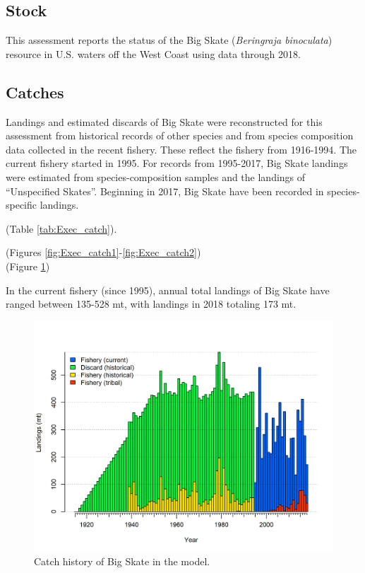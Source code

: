 \documentclass[12pt,]{article}
\begin{document}
\hypertarget{stock}{%
\subsection*{Stock}\label{stock}}

This assessment reports the status of the Big Skate
(\emph{Beringraja binoculata}) resource in U.S. waters off the West
Coast using data through 2018.

\hypertarget{catches}{%
\subsection*{Catches}\label{catches}}

Landings and estimated discards of Big Skate were reconstructed for this
assessment from historical records of other species and from species
composition data collected in the recent fishery. These reflect the
fishery from 1916-1994. The current fishery started in 1995. For records
from 1995-2017, Big Skate landings were estimated from
species-composition samples and the landings of ``Unspecified Skates''.
Beginning in 2017, Big Skate have been recorded in species-specific
landings.

(Table \ref{tab:Exec_catch}).

(Figures \ref{fig:Exec_catch1}-\ref{fig:Exec_catch2})\\
(Figure \ref{fig:r4ss_catches})

In the current fishery (since 1995), annual total landings of Big Skate
have ranged between 135-528 mt, with landings in 2018 totaling 173 mt.

\FloatBarrier

\FloatBarrier

\begin{figure}
\centering
\includegraphics{r4ss/plots_mod1/catch2 landings stacked.png}
\caption{Catch history of Big Skate in the model.
\label{fig:r4ss_catches}}
\end{figure}
\end{document}
